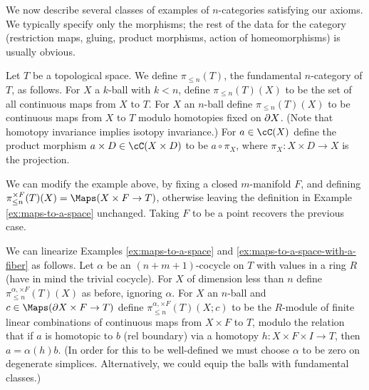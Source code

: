 We now describe several classes of examples of $n$-categories satisfying our axioms.
We typically specify only the morphisms; the rest of the data for the category
(restriction maps, gluing, product morphisms, action of homeomorphisms) is usually obvious.

\begin{example}
\rm
\label{ex:maps-to-a-space}%
Let $T$ be a topological space.
We define $\pi_{\leq n}(T)$, the fundamental $n$-category of $T$, as follows.
For $X$ a $k$-ball with $k < n$, define $\pi_{\leq n}(T)(X)$ to be the set of 
all continuous maps from $X$ to $T$.
For $X$ an $n$-ball define $\pi_{\leq n}(T)(X)$ to be continuous maps from $X$ to $T$ modulo
homotopies fixed on $\partial X$.
(Note that homotopy invariance implies isotopy invariance.)
For $a\in \cC(X)$ define the product morphism $a\times D \in \cC(X\times D)$ to
be $a\circ\pi_X$, where $\pi_X : X\times D \to X$ is the projection.
\end{example}


\begin{example} \label{ex:maps-with-fiber}
\rm
\label{ex:maps-to-a-space-with-a-fiber}%
We can modify the example above, by fixing a
closed $m$-manifold $F$, and defining $\pi^{\times F}_{\leq n}(T)(X) = \Maps(X \times F \to T)$, 
otherwise leaving the definition in Example \ref{ex:maps-to-a-space} unchanged.
Taking $F$ to be a point recovers the previous case.
\end{example}

\begin{example}
\rm
\label{ex:linearized-maps-to-a-space}%
We can linearize Examples \ref{ex:maps-to-a-space} and \ref{ex:maps-to-a-space-with-a-fiber} as follows.
Let $\alpha$ be an $(n{+}m{+}1)$-cocycle on $T$ with values in a ring $R$
(have in mind the trivial cocycle).
For $X$ of dimension less than $n$ define $\pi^{\alpha, \times F}_{\leq n}(T)(X)$ as before, ignoring $\alpha$.
For $X$ an $n$-ball and $c\in \Maps(\bdy X \times F \to T)$ define $\pi^{\alpha, \times F}_{\leq n}(T)(X; c)$ to be
the $R$-module of finite linear combinations of continuous maps from $X\times F$ to $T$,
modulo the relation that if $a$ is homotopic to $b$ (rel boundary) via a homotopy
$h: X\times F\times I \to T$, then $a = \alpha(h)b$.
(In order for this to be well-defined we must choose $\alpha$ to be zero on degenerate simplices.
Alternatively, we could equip the balls with fundamental classes.)
\end{example}

